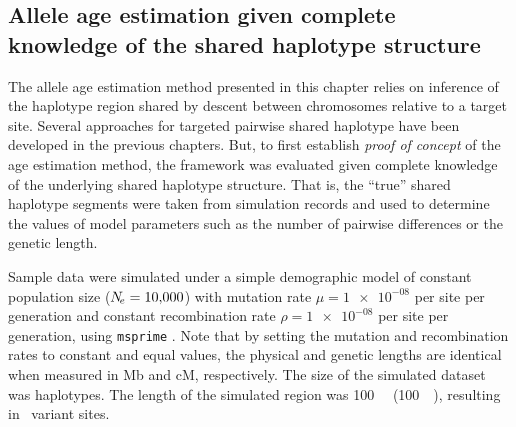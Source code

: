 




%
\subsection{Allele age estimation given complete knowledge of the shared haplotype structure}
%

The allele age estimation method presented in this chapter relies on inference of the haplotype region shared by descent between  chromosomes relative to a target site.
Several approaches for targeted pairwise shared haplotype have been developed in the previous chapters.
But, to first establish \emph{proof of concept} of the age estimation method, the framework was evaluated given complete knowledge of the underlying shared haplotype structure.
That is, the ``true'' shared haplotype segments were taken from simulation records and used to determine the values of model parameters such as the number of pairwise differences or the genetic length.



Sample data were simulated under a simple demographic model of constant population size (${N_{\!e} = \num{10000}}$) with mutation rate ${\mu = \num{1e-08}}$ per site per generation and constant recombination rate ${\rho = \num{1e-08}}$ per site per generation, using \texttt{msprime} \citep{Kelleher:2016fn}.
Note that by setting the mutation and recombination rates to constant and equal values, the physical and genetic lengths are identical when measured in \gls{Mb} and \gls{cM}, respectively.
The size of the simulated dataset was  haplotypes.
The length of the simulated region was \SI{100}{\mega\basepair} (\SI{100}{\centi\morgan}), resulting in ~variant sites.



